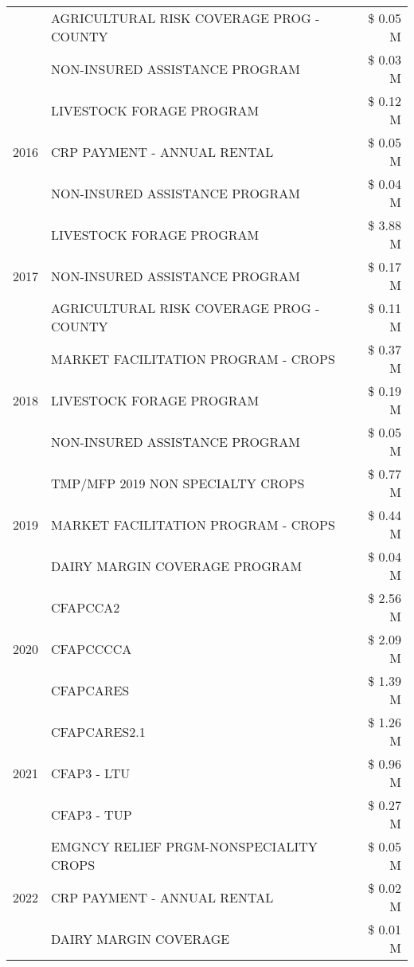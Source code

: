 \begin{tabular}{llr}
 & AGRICULTURAL RISK COVERAGE PROG - COUNTY & \$ 0.05 M \\
 & NON-INSURED ASSISTANCE PROGRAM & \$ 0.03 M \\
\cline{1-3}
\multirow[t]{3}{*}{2016} & LIVESTOCK FORAGE PROGRAM & \$ 0.12 M \\
 & CRP PAYMENT - ANNUAL RENTAL & \$ 0.05 M \\
 & NON-INSURED ASSISTANCE PROGRAM & \$ 0.04 M \\
\cline{1-3}
\multirow[t]{3}{*}{2017} & LIVESTOCK FORAGE PROGRAM & \$ 3.88 M \\
 & NON-INSURED ASSISTANCE PROGRAM & \$ 0.17 M \\
 & AGRICULTURAL RISK COVERAGE PROG - COUNTY & \$ 0.11 M \\
\cline{1-3}
\multirow[t]{3}{*}{2018} & MARKET FACILITATION PROGRAM - CROPS & \$ 0.37 M \\
 & LIVESTOCK FORAGE PROGRAM & \$ 0.19 M \\
 & NON-INSURED ASSISTANCE PROGRAM & \$ 0.05 M \\
\cline{1-3}
\multirow[t]{3}{*}{2019} & TMP/MFP 2019 NON SPECIALTY CROPS & \$ 0.77 M \\
 & MARKET FACILITATION PROGRAM - CROPS & \$ 0.44 M \\
 & DAIRY MARGIN COVERAGE PROGRAM & \$ 0.04 M \\
\cline{1-3}
\multirow[t]{3}{*}{2020} & CFAPCCA2 & \$ 2.56 M \\
 & CFAPCCCCA & \$ 2.09 M \\
 & CFAPCARES & \$ 1.39 M \\
\cline{1-3}
\multirow[t]{3}{*}{2021} & CFAPCARES2.1 & \$ 1.26 M \\
 & CFAP3 - LTU & \$ 0.96 M \\
 & CFAP3 - TUP & \$ 0.27 M \\
\cline{1-3}
\multirow[t]{3}{*}{2022} & EMGNCY RELIEF PRGM-NONSPECIALITY CROPS & \$ 0.05 M \\
 & CRP PAYMENT - ANNUAL RENTAL & \$ 0.02 M \\
 & DAIRY MARGIN COVERAGE & \$ 0.01 M \\
\cline{1-3}
\bottomrule
\end{tabular}
